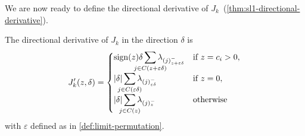 We are now ready to define the directional derivative of \(J_k\)~(\cref{thm:sl1-directional-derivative}).

\begin{theorem}\label{thm:sl1-directional-derivative}
  The directional derivative of \(J_k\) in the direction \(\delta\) is
  \[
    J'_k(z, \delta) =
    \begin{cases}
      \sign(z)\delta\smashoperator{\sum_{j \in C(z + \varepsilon \delta)}}
      \lambda_{(j)^-_{z + \varepsilon\delta}}                      & \text{if } z = c_i > 0, \\
      |\delta|\smashoperator{\sum_{j \in C(\varepsilon \delta)}}
      \lambda_{(j)^-_{\varepsilon\delta}}                          & \text{if } z = 0,       \\
      |\delta| \smashoperator{\sum_{j \in C(z)}} \lambda_{(j)^-_z} & \text{otherwise}
    \end{cases}
  \]
  with \(\varepsilon\) defined as in \cref{def:limit-permutation}.
\end{theorem}
